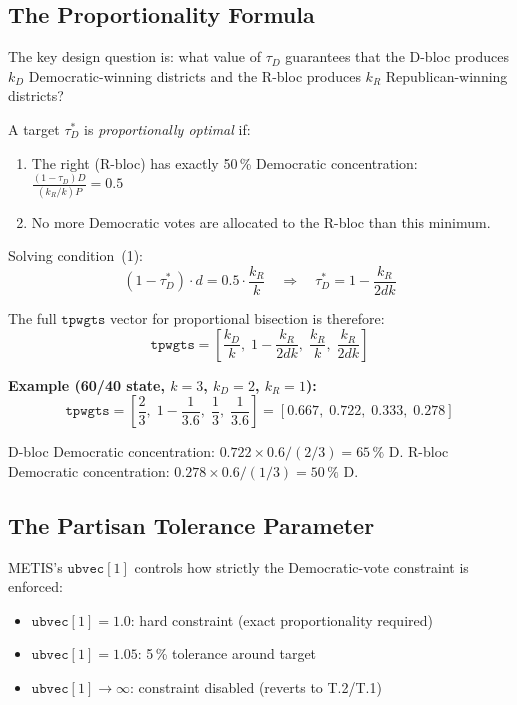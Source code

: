 \subsection{The Proportionality Formula}
\label{sec:formula}

The key design question is: what value of $\tau_D$ guarantees that the D-bloc
produces $k_D$ Democratic-winning districts and the R-bloc produces $k_R$
Republican-winning districts?

\begin{definition}
A target $\tau_D^*$ is \emph{proportionally optimal} if:
\begin{enumerate}
  \item The right (R-bloc) has exactly 50\,\% Democratic concentration:
    $\frac{(1-\tau_D) D}{(k_R/k) P} = 0.5$
  \item No more Democratic votes are allocated to the R-bloc than this minimum.
\end{enumerate}
\end{definition}

Solving condition~(1):
\[
  (1 - \tau_D^*) \cdot d = 0.5 \cdot \frac{k_R}{k}
  \quad \Longrightarrow \quad
  \tau_D^* = 1 - \frac{k_R}{2dk}
\]

The full $\mathtt{tpwgts}$ vector for proportional bisection is therefore:
\begin{equation}
  \label{eq:tpwgts-formula}
  \boxed{\mathtt{tpwgts} = \left[\frac{k_D}{k},\; 1 - \frac{k_R}{2dk},\;
                                  \frac{k_R}{k},\; \frac{k_R}{2dk}\right]}
\end{equation}

\noindent\textbf{Example (60/40 state, $k=3$, $k_D=2$, $k_R=1$):}
\[
  \mathtt{tpwgts} = \left[\frac{2}{3},\; 1 - \frac{1}{3.6},\; \frac{1}{3},\; \frac{1}{3.6}\right]
                  = [0.667,\; 0.722,\; 0.333,\; 0.278]
\]

D-bloc Democratic concentration: $0.722 \times 0.6 / (2/3) = 65\,\%$ D.
R-bloc Democratic concentration: $0.278 \times 0.6 / (1/3) = 50\,\%$ D. \checkmark

\subsection{The Partisan Tolerance Parameter}

METIS's $\mathtt{ubvec}[1]$ controls how strictly the Democratic-vote constraint
is enforced:
\begin{itemize}
  \item $\mathtt{ubvec}[1] = 1.0$: hard constraint (exact proportionality required)
  \item $\mathtt{ubvec}[1] = 1.05$: 5\,\% tolerance around target
  \item $\mathtt{ubvec}[1] \to \infty$: constraint disabled (reverts to T.2/T.1)
\end{itemize}

